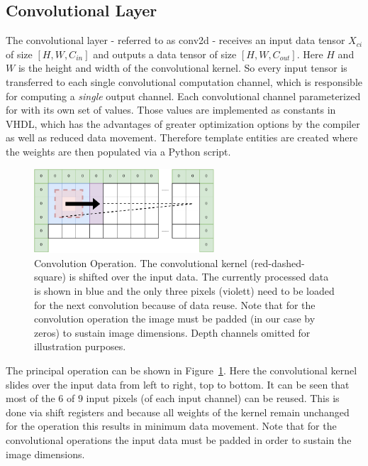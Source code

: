 \subsection{Convolutional Layer}

The convolutional layer - referred to as conv2d - receives an input data tensor $X_{ci} $ of size $[H, W, C_{in}]$ and outputs a data tensor of size $[H,W,C_{out}]$. Here $H$ and $W$ is the height and width of the convolutional kernel. So every input tensor is transferred to each single convolutional computation channel, which is responsible for computing a \emph{single} output channel. Each convolutional channel parameterized for with its own set of values. Those values are implemented as constants in VHDL, which has the advantages of greater optimization options by the compiler as well as reduced data movement. Therefore template entities are created where the weights are then populated via a Python script.

\begin{figure}[hb]
	\centering
	\includegraphics[width=0.6\textwidth]{img/convolution}
	\caption[Convolution Operation]{Convolution Operation. The convolutional kernel (red-dashed-square) is shifted over the input data. The currently processed data is shown in blue and the only three pixels (violett) need to be loaded for the next convolution because of data reuse. Note that for the convolution operation the image must be padded (in our case by zeros) to sustain image dimensions. Depth channels omitted for illustration purposes.}
	\label{fig:hw-conv-operation}
\end{figure}

The principal operation can be shown in Figure~\ref{fig:hw-conv-operation}. Here the convolutional kernel slides over the input data from left to right, top to bottom. It can be seen that most of the $6$ of $9$ input pixels (of each input channel) can be reused. This is done via shift registers and because all weights of the kernel remain unchanged for the operation this results in minimum data movement. Note that for the convolutional operations the input data must be padded in order to sustain the image dimensions.


